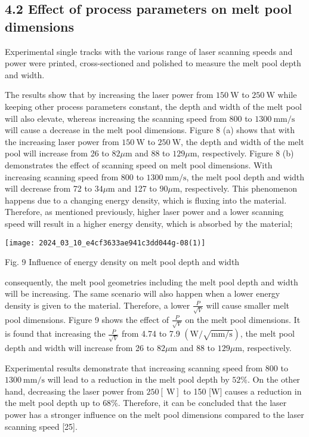 \documentclass[10pt]{article}
\begin{document}
\subsection*{4.2 Effect of process parameters on melt pool dimensions}
Experimental single tracks with the various range of laser scanning speeds and power were printed, cross-sectioned and polished to measure the melt pool depth and width.

The results show that by increasing the laser power from $150 \mathrm{~W}$ to $250 \mathrm{~W}$ while keeping other process parameters constant, the depth and width of the melt pool will also elevate, whereas increasing the scanning speed from 800 to $1300 \mathrm{~mm} / \mathrm{s}$ will cause a decrease in the melt pool dimensions. Figure 8 (a) shows that with the increasing laser power from $150 \mathrm{~W}$ to $250 \mathrm{~W}$, the depth and width of the melt pool will increase from 26 to $82 \mu \mathrm{m}$ and 88 to $129 \mu \mathrm{m}$, respectively. Figure 8 (b) demonstrates the effect of scanning speed on melt pool dimensions. With increasing scanning speed from 800 to $1300 \mathrm{~mm} / \mathrm{s}$, the melt pool depth and width will decrease from 72 to $34 \mu \mathrm{m}$ and 127 to $90 \mu \mathrm{m}$, respectively. This phenomenon happens due to a changing energy density, which is fluxing into the material. Therefore, as mentioned previously, higher laser power and a lower scanning speed will result in a higher energy density, which is absorbed by the material;

\begin{center}
\texttt{[image: 2024\_03\_10\_e4cf3633ae941c3dd044g-08(1)]}
\end{center}

Fig. 9 Influence of energy density on melt pool depth and width

consequently, the melt pool geometries including the melt pool depth and width will be increasing. The same scenario will also happen when a lower energy density is given to the material. Therefore, a lower $\frac{P}{\sqrt{V}}$ will cause smaller melt pool dimensions. Figure 9 shows the effect of $\frac{P}{\sqrt{V}}$ on the melt pool dimensions. It is found that increasing the $\frac{P}{\sqrt{V}}$ from 4.74 to 7.9 $(\mathrm{W} / \sqrt{\mathrm{mm} / \mathrm{s}})$, the melt pool depth and width will increase from 26 to $82 \mu \mathrm{m}$ and 88 to $129 \mu \mathrm{m}$, respectively.

Experimental results demonstrate that increasing scanning speed from 800 to $1300 \mathrm{~mm} / \mathrm{s}$ will lead to a reduction in the melt pool depth by $52 \%$. On the other hand, decreasing the laser power from $250[\mathrm{~W}]$ to 150 [W] causes a reduction in the melt pool depth up to $68 \%$. Therefore, it can be concluded that the laser power has a stronger influence on the melt pool dimensions compared to the laser scanning speed [25].
\end{document}

